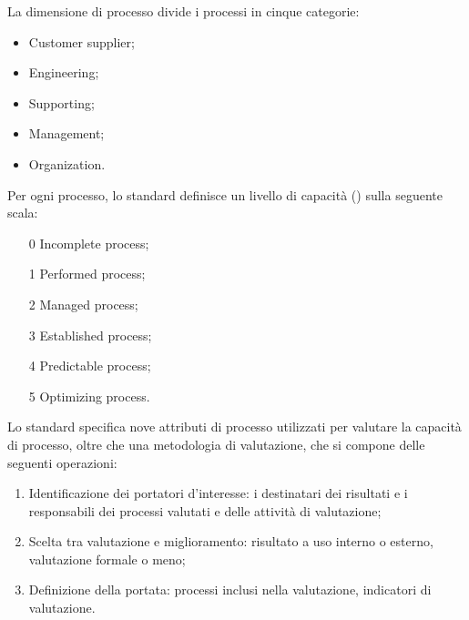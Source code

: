 La dimensione di processo divide i processi in cinque categorie:

\begin{itemize}
  \item Customer supplier;
  \item Engineering;
  \item Supporting;
  \item Management;
  \item Organization.
\end{itemize}

Per ogni processo, lo standard definisce un livello di capacità
() sulla seguente scala:

\begin{enumerate}
  \item[0] Incomplete process;
  \item[1] Performed process;
  \item[2] Managed process;
  \item[3] Established process;
  \item[4] Predictable process;
  \item[5] Optimizing process.
\end{enumerate}

Lo standard specifica nove attributi di processo utilizzati per valutare la
capacità di processo, oltre che una metodologia di valutazione, che si compone
delle seguenti operazioni:

\begin{enumerate}
  \item Identificazione dei portatori d'interesse: i destinatari dei
    risultati e i responsabili dei processi valutati e delle attività di
    valutazione;
  \item Scelta tra valutazione e miglioramento: risultato a uso interno o
    esterno, valutazione formale o meno;
  \item Definizione della portata: processi inclusi nella valutazione,
    indicatori di valutazione.
\end{enumerate}
